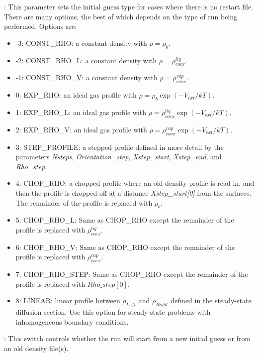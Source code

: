 \documentclass[10pt,onecolumn]{article}
\begin{document}
\vspace{0.1in}
:
This parameter sets the initial guess type for cases where
there is no restart file.  There are many options, the best of which
depends on the type of run being performed.  Options are:

\begin{itemize}
\item{-3: CONST\_RHO: a constant density with $\rho=\rho_b$.}
\item{-2: CONST\_RHO\_L: a constant density with $\rho=\rho_{coex}^{liq}$.}
\item{-1: CONST\_RHO\_V: a constant density with $\rho=\rho_{coex}^{vap}$.}
\item{0: EXP\_RHO: an ideal gas profile with $\rho=\rho_b \exp(-V_{ext}/kT)$.}
\item{1: EXP\_RHO\_L: an ideal gas profile with $\rho=\rho_{coex}^{liq} \exp(-V_{ext}/kT)$.}
\item{2: EXP\_RHO\_V: an ideal gas profile with $\rho=\rho_{coex}^{vap} \exp(-V_{ext}/kT)$.}
\item{3: STEP\_PROFILE:  a stepped profile defined in more detail by the parameters
{\it Nsteps}, {\it Orientation\_step}, {\it Xstep\_start}, {\it Xstep\_end}, and
{\it Rho\_step}.}
\item{4: CHOP\_RHO: a chopped profile where an old density profile is 
read in, and then the profile is chopped off at a distance {\it Xstep\_start[0]}
from the surfaces.  The remainder of the profile is replaced with $\rho_b$.}
\item{5: CHOP\_RHO\_L: Same as CHOP\_RHO except the remainder of the profile is replaced with
$\rho_{coex}^{liq}$.}
\item{6: CHOP\_RHO\_V: Same as CHOP\_RHO except the remainder of the profile is replaced with
$\rho_{coex}^{vap}$.}
\item{7: CHOP\_RHO\_STEP: Same as CHOP\_RHO except the remainder of the profile is replaced with
$Rho\_step[0]$.}
\item{8: LINEAR:  linear profile between  $\rho_{Left}$
and $\rho_{Right}$ defined in the steady-state diffusion section. 
Use this option for steady-state problems
with inhomogeneous boundary conditions.}
\end{itemize}

\vspace{0.1in}
: This switch controls whether the run will start
from a new initial guess or from an old density file(s).  
\end{document}
